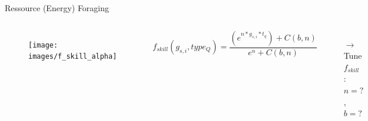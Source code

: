 \documentclass[8pt,handout,notes=show]{beamer}
\begin{document}
% 

\begin{frame}{Ressource (Energy) Foraging}

 

 

\begin{columns} 



\begin{figure}
\texttt{[image: images/f\_skill\_alpha]}
\end{figure}


 $$ f_{skill}(g_{s,i},type_Q)= {\frac{\left(e^{n*g_{s,i}*t_q}\right)+C(b,n)} {e^{n}+C(b,n)}}$$
\begin{enumerate}
	\item[ $\rightarrow$] Tune $f_{skill}$ : $n=?$, $b=?$
\end{enumerate}

\end{columns}


\end{frame}
\end{document}
